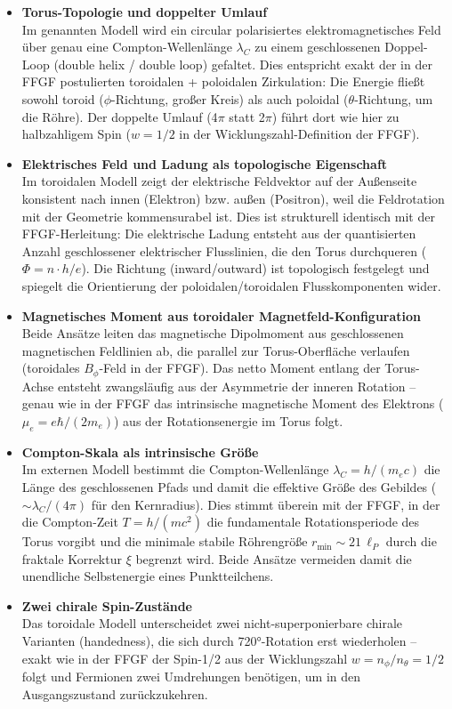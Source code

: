 	\begin{itemize}
		\item \textbf{Torus-Topologie und doppelter Umlauf}\\
		Im genannten Modell wird ein circular polarisiertes elektromagnetisches Feld über genau eine Compton-Wellenlänge $\lambda_C$ zu einem geschlossenen Doppel-Loop (double helix / double loop) gefaltet. Dies entspricht exakt der in der FFGF postulierten toroidalen + poloidalen Zirkulation: Die Energie fließt sowohl toroid ($\phi$-Richtung, großer Kreis) als auch poloidal ($\theta$-Richtung, um die Röhre). Der doppelte Umlauf (4$\pi$ statt 2$\pi$) führt dort wie hier zu halbzahligem Spin ($w = 1/2$ in der Wicklungszahl-Definition der FFGF).
		
		\item \textbf{Elektrisches Feld und Ladung als topologische Eigenschaft}\\
		Im toroidalen Modell zeigt der elektrische Feldvektor auf der Außenseite konsistent nach innen (Elektron) bzw. außen (Positron), weil die Feldrotation mit der Geometrie kommensurabel ist. Dies ist strukturell identisch mit der FFGF-Herleitung: Die elektrische Ladung entsteht aus der quantisierten Anzahl geschlossener elektrischer Flusslinien, die den Torus durchqueren ($\Phi = n \cdot h/e$). Die Richtung (inward/outward) ist topologisch festgelegt und spiegelt die Orientierung der poloidalen/toroidalen Flusskomponenten wider.
		
		\item \textbf{Magnetisches Moment aus toroidaler Magnetfeld-Konfiguration}\\
		Beide Ansätze leiten das magnetische Dipolmoment aus geschlossenen magnetischen Feldlinien ab, die parallel zur Torus-Oberfläche verlaufen (toroidales $B_\phi$-Feld in der FFGF). Das netto Moment entlang der Torus-Achse entsteht zwangsläufig aus der Asymmetrie der inneren Rotation – genau wie in der FFGF das intrinsische magnetische Moment des Elektrons ($\mu_e = e\hbar / (2m_e)$) aus der Rotationsenergie im Torus folgt.
		
		\item \textbf{Compton-Skala als intrinsische Größe}\\
		Im externen Modell bestimmt die Compton-Wellenlänge $\lambda_C = h/(m_ec)$ die Länge des geschlossenen Pfads und damit die effektive Größe des Gebildes ($\sim \lambda_C / (4\pi)$ für den Kernradius). Dies stimmt überein mit der FFGF, in der die Compton-Zeit $T = h/(m c^2)$ die fundamentale Rotationsperiode des Torus vorgibt und die minimale stabile Röhrengröße $r_{\min} \sim 21\,\ell_P$ durch die fraktale Korrektur $\xi$ begrenzt wird. Beide Ansätze vermeiden damit die unendliche Selbstenergie eines Punktteilchens.
		
		\item \textbf{Zwei chirale Spin-Zustände}\\
		Das toroidale Modell unterscheidet zwei nicht-superponierbare chirale Varianten (handedness), die sich durch 720°-Rotation erst wiederholen – exakt wie in der FFGF der Spin-1/2 aus der Wicklungszahl $w = n_\phi / n_\theta = 1/2$ folgt und Fermionen zwei Umdrehungen benötigen, um in den Ausgangszustand zurückzukehren.
	\end{itemize}
	

